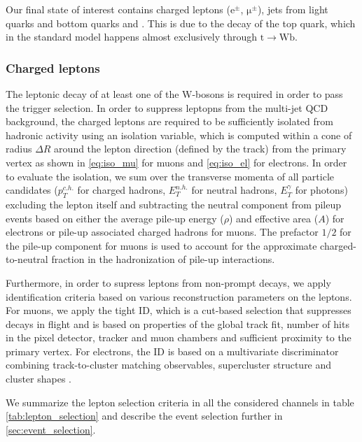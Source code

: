 Our final state of interest contains charged leptons ($\mathrm{e}^\pm$, $\mathrm{\mu}^\pm$), jets from light quarks and bottom quarks and \MET. This is due to the decay of the top quark, which in the standard model happens almost exclusively through $\mathrm{t} \rightarrow \mathrm{W} \mathrm{b}$.

\subsubsection{Charged leptons}
\label{sec:object_id_lep}

The leptonic decay of at least one of the W-bosons is required in order to pass the trigger selection. In order to suppress leptopns from the multi-jet QCD background, the charged leptons are required to be sufficiently isolated from hadronic activity using an isolation variable, which is computed within a cone of radius $\Delta R$ around the lepton direction (defined by the track) from the primary vertex as shown in \cref{eq:iso_mu} for muons and \cref{eq:iso_el} for electrons. In order to evaluate the isolation, we sum over the transverse momenta of all particle candidates ($p_T^{c.h.}$ for charged hadrons, $E_T^{n.h.}$ for neutral hadrons, $E_T^{\gamma}$ for photons) excluding the lepton itself and subtracting the neutral component from pileup events based on either the average pile-up energy ($\rho$) and effective area ($A$) for electrons or pile-up associated charged hadrons for muons. The prefactor $1/2$ for the pile-up component for muons is used to account for the approximate charged-to-neutral fraction in the hadronization of pile-up interactions\cite{CMS:2012}.

Furthermore, in order to supress leptons from non-prompt decays, we apply identification criteria based on various reconstruction parameters on the leptons. For muons, we apply the tight ID, which is a cut-based selection that suppresses decays in flight and is based on properties of the global track fit, number of hits in the pixel detector, tracker and muon chambers and sufficient proximity to the primary vertex\cite{Chatrchyan:2012xi,CMS:2017_muon_pog}. For electrons, the ID is based on a multivariate discriminator combining track-to-cluster matching observables, supercluster structure and cluster shapes \cite{Khachatryan:2015hwa,CMS:2017_egamma_pog}.

We summarize the lepton selection criteria in all the considered channels in table \cref{tab:lepton_selection} and describe the event selection further in \cref{sec:event_selection}.


